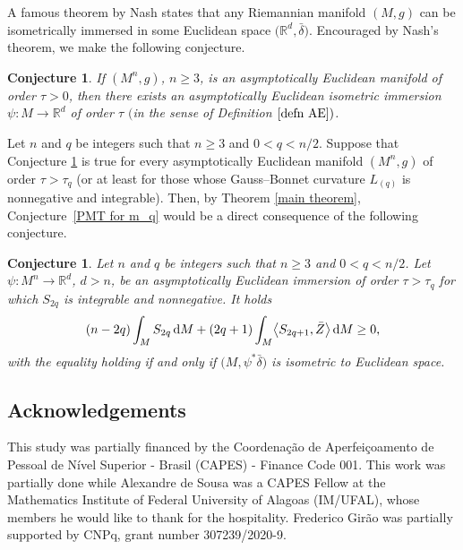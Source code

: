 \documentclass[pdftex]{sigma}
\numberwithin{equation}{section}
\newtheorem{Conjecture}[Theorem]{Conjecture}
 { \theoremstyle{definition}
\newtheorem{Definition}[Theorem]{Definition}
\newtheorem{Note}[Theorem]{Note}
\newtheorem{Example}[Theorem]{Example}
\newtheorem{Remark}[Theorem]{Remark}
\newtheorem{Question}[Theorem]{Question}}
\begin{document}
A famous theorem by Nash \cite{Nash} states that any Riemannian manifold $(M,g)$ can be isometrically immersed in some Euclidean space $\bigl(\mathbb{R}^d, \bar{\delta}\bigr)$. Encouraged by Nash's theorem, we make the following conjecture.

\begin{Conjecture} \label{q1}
   If $(M^n,g)$, $n \geq 3$, is an asymptotically Euclidean manifold of order $\tau > 0$, then there exists an asymptotically Euclidean isometric immersion $\psi\colon  M \to \mathbb{R}^d$ of order $\tau$
  $($in the sense of Definition $\ref{defn AE})$.
\end{Conjecture}

Let $n$ and $q$ be integers such that $n \geq 3$ and $0 < q < n/2$. Suppose that Conjecture \ref{q1} is true for every asymptotically Euclidean manifold $(M^n,g)$ of order $\tau > \tau_q$ (or at least for those whose Gauss--Bonnet curvature $L_{(q)}$ is nonnegative and integrable). Then, by Theorem \ref{main theorem}, Conjecture~\ref{PMT for m_q} would be a direct consequence of the following conjecture.

\begin{Conjecture} \label{q2}
   Let $n$ and $q$ be integers such that $n \geq 3$ and $0 < q < n/2$. Let $\psi\colon  M^n \to \mathbb{R}^d$, $d>n$, be an asymptotically Euclidean immersion of order $\tau > \tau_q$ for which $S_{2q}$ is integrable and nonnegative. It holds
  \begin{equation*}
    (n-2q) \int_M S_{2q} \, {\rm d}M + (2q+1) \int_M \bigl\langle S_{2q+1}, \bar{Z} \bigr\rangle \, {\rm d}M \geq 0,
  \end{equation*}
  with the equality holding if and only if $\bigl(M,\psi^\ast \bar{\delta}\bigr)$ is isometric
  to Euclidean space.
\end{Conjecture}

\subsection*{Acknowledgements}

This study was partially financed by the Coordena\c c\~ao de Aperfei\c coamento de Pessoal de N\'ivel Superior - Brasil (CAPES) - Finance Code 001.
This work was partially done while Alexandre de Sousa was a CAPES Fellow at the Mathematics Institute of Federal University of Alagoas (IM/UFAL), whose members he would like to thank for the hospitality.
Frederico Gir\~ao was partially supported by CNPq, grant number 307239/2020-9.
\end{document}
